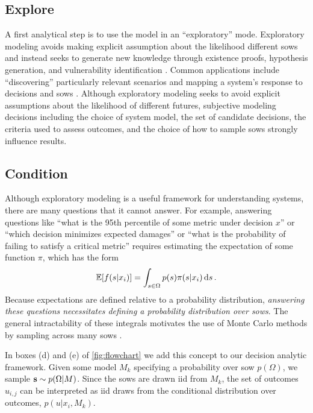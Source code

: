 \documentclass[11pt]{article}
\begin{document}
\subsection{Explore}\label{sec:analysis-explore}

A first analytical step is to use the model in an ``exploratory'' mode.
Exploratory modeling avoids making explicit assumption  about the likelihood different \glspl{sow} and instead seeks to generate new knowledge through existence proofs, hypothesis generation, and vulnerability identification \citep{bankes:1993}.
Common applications include ``discovering'' particularly relevant scenarios  \citep{lamontagne_discovery:2018,groves_scenarios:2007} and mapping a system's response to decisions and \glspl{sow} \citep{Brown:2012kb,Poff:2015jn,Steinschneider:2015kk,sriver_sealevel:2018}.
Although exploratory modeling seeks to avoid explicit assumptions about the likelihood of different futures, subjective modeling decisions including the choice of system model, the set of candidate decisions, the criteria used to assess outcomes, and the choice of how to sample \glspl{sow} \citep[see][]{quinn_exploratory:2020} strongly influence results.

\subsection{Condition}\label{sec:analysis-condition}

Although exploratory modeling is a useful framework for understanding systems, there are many questions that it cannot answer.
For example, answering questions like ``what is the 95th percentile of some metric under decision $x$'' or ``which decision minimizes expected damages'' or ``what is the probability of failing to satisfy a critical metric''  requires estimating the expectation of some function $\pi$, which has the form
\begin{equation*}
    \mathbb{E}\qty[f(s | x_i)] = \int_{s \in \Omega} p(s) \pi(s | x_i) \dd{s}.
\end{equation*}
Because expectations are defined relative to a probability distribution, \emph{answering these questions necessitates defining a probability distribution over \glspl{sow}}.
The general intractability of these integrals motivates the use of Monte Carlo methods by sampling across many \glspl{sow} \citep{Betancourt:2017vd}.

In boxes (d) and (e) of \cref{fig:flowchart} we add this concept to our decision analytic framework.
Given some model $M_k$ specifying a probability over \gls{sow} $p(\Omega)$, we sample $\vb{s} \sim p(\Omega | M)$.
Since the \glspl{sow} are drawn \gls{iid} from $M_k$, the set of outcomes $u_{i, j}$ can be interpreted as \gls{iid} draws from the conditional distribution over outcomes, $p(u | x_i, M_k)$.
\end{document}
